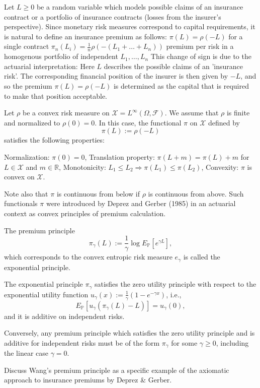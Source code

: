 Let \(L \geq 0\) be a random variable which models possible claims of an insurance contract or a portfolio of insurance contracts (losses from the insurer's perspective).
Since monetary risk measures correspond to capital requirements, it is natural to define an insurance premium as follows:
\(\pi(L) = \rho(-L)\) for a single contract
\(\pi_n(L_i) = \frac{1}{n} \rho(-(L_1 + \dots + L_n))\) premium per risk in a homogenous portfolio of independent \(L_1, \dots, L_n\)
This change of sign is due to the actuarial interpretation: Here \(L\) describes the possible claims of an 'insurance risk'. 
The corresponding financial position of the insurer is then given by \(-L\), and so the premium \(\pi(L) = \rho(-L)\) is determined 
as the capital that is required to make that position acceptable.

Let \(\rho\) be a convex risk measure on \(\mathcal{X} = L^{\infty}(\Omega, \mathcal{F})\). 
We assume that \(\rho\) is finite and normalized to \(\rho(0)=0\).
In this case, the functional \(\pi\) on \(\mathcal{X}\) defined by
\[\pi(L) := \rho(-L)\]
satisfies the following properties:

Normalization: \(\pi(0)=0\),
Translation property: \(\pi(L+m) = \pi(L) + m\) for \(L \in \mathcal{X}\) and \(m \in \mathbb{R}\),
Monotonicity: \(L_1 \leq L_2 \Rightarrow \pi(L_1) \leq \pi(L_2)\),
Convexity: \(\pi\) is convex on \(\mathcal{X}\).

Note also that \(\pi\) is continuous from below if \(\rho\) is continuous from above.
Such functionals \(\pi\) were introduced by Deprez and Gerber (1985) in an actuarial context as convex principles of premium calculation.

The premium principle
\[\pi_{\gamma}(L) := \frac{1}{\gamma} \log E_{\mathbb{P}}[e^{\gamma L}],\]
which corresponds to the convex entropic risk measure \(e_{\gamma}\) is called the exponential principle.

The exponential principle \(\pi_{\gamma}\) satisfies the zero utility principle with respect to the exponential utility function 
\(u_{\gamma}(x) := \frac{1}{\gamma}(1-e^{-\gamma x})\), i.e.,
\[E_{\mathbb{P}}[u_{\gamma}(\pi_{\gamma}(L)-L)] = u_{\gamma}(0),\]
and it is additive on independent risks.

Conversely, any premium principle which satisfies the zero utility principle and is additive for independent risks must be of the form 
\(\pi_{\gamma}\) for some \(\gamma \geq 0\), including the linear case \(\gamma = 0\).

Discuss Wang’s premium principle as a specific example of the axiomatic approach to insurance premiums by Deprez & Gerber.

